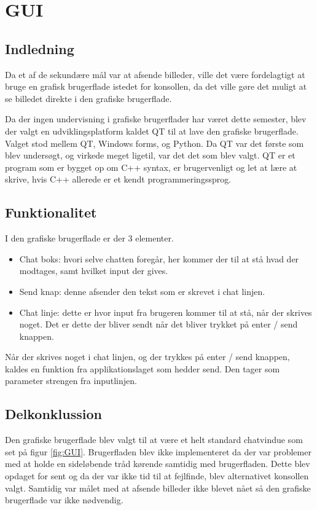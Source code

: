 \section{GUI}

\subsection{Indledning}
Da et af de sekundære mål var at afsende billeder, ville det være fordelagtigt at bruge en grafisk brugerflade istedet for konsollen, da det ville gøre det muligt at se billedet direkte i den grafiske brugerflade.

Da der ingen undervisning i grafiske brugerflader har været dette semester, blev der valgt en udviklingsplatform kaldet QT til at lave den grafiske brugerflade.
Valget stod mellem QT, Windows forms, og Python.
Da QT var det første som blev undersøgt, og virkede meget ligetil, var det det som blev valgt.
QT er et program som er bygget op om C++ syntax, er brugervenligt og let at lære at skrive, hvis C++ allerede er et kendt programmeringssprog.\\
\subsection{Funktionalitet}

I den grafiske brugerflade er der 3 elementer.
\begin{itemize}[noitemsep]
	\item Chat boks: hvori selve chatten foregår, her kommer der til at stå hvad der modtages, samt hvilket input der gives.
	\item Send knap: denne afsender den tekst som er skrevet i chat linjen.
	\item Chat linje: dette er hvor input fra brugeren kommer til at stå, når der skrives noget. Det er dette der bliver sendt når det bliver trykket på enter / send knappen.
\end{itemize}

Når der skrives noget i chat linjen, og der trykkes på enter / send knappen, kaldes en funktion fra applikationslaget som hedder send. Den tager som parameter strengen fra inputlinjen.

\subsection{Delkonklussion}
Den grafiske brugerflade blev valgt til at være et helt standard chatvindue som set på figur \ref{fig:GUI}.
Brugerfladen blev ikke implementeret da der var problemer med at holde en sideløbende tråd kørende samtidig med brugerfladen.
Dette blev opdaget for sent og da der var ikke tid til at fejlfinde, blev alternativet konsollen valgt.
Samtidig var målet med at afsende billeder ikke blevet nået så den grafiske brugerflade var ikke nødvendig.

